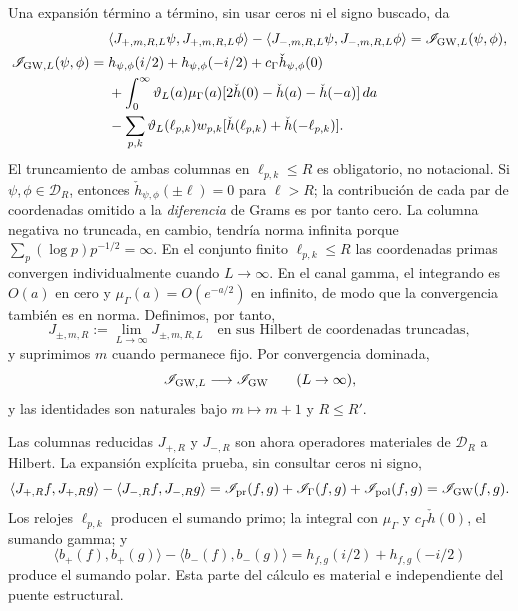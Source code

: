 Una expansión término a término, sin usar ceros ni el signo buscado, da
\begin{align*}
 &\langle J_{+,m,R,L}\psi,J_{+,m,R,L}\phi\rangle
 -\langle J_{-,m,R,L}\psi,J_{-,m,R,L}\phi\rangle
 =\mathscr I_{{\rm GW},L}(\psi,\phi),\\
 \mathscr I_{{\rm GW},L}(\psi,\phi)
 ={}&h_{\psi,\phi}(i/2)+h_{\psi,\phi}(-i/2)
 +c_\Gamma\check h_{\psi,\phi}(0)\\
 &+\int_0^\infty\vartheta_L(a)\mu_\Gamma(a)
 [2\check h(0)-\check h(a)-\check h(-a)]\,da\\
 &-\sum_{p,k}\vartheta_L(\ell_{p,k})w_{p,k}
 [\check h(\ell_{p,k})+\check h(-\ell_{p,k})].
\end{align*}
El truncamiento de ambas columnas en \(\ell_{p,k}\leq R\) es obligatorio, no
notacional. Si \(\psi,\phi\in\mathcal D_R\), entonces
\(\check h_{\psi,\phi}(\pm\ell)=0\) para \(\ell>R\); la contribución de cada
par de coordenadas omitido a la \emph{diferencia} de Grams es por tanto cero.
La columna negativa no truncada, en cambio, tendría norma infinita porque
\(\sum_p(\log p)p^{-1/2}=\infty\). En el conjunto finito
\(\ell_{p,k}\leq R\) las coordenadas primas convergen individualmente cuando
\(L\to\infty\). En el canal gamma, el integrando es \(O(a)\) en cero y
\(\mu_\Gamma(a)=O(e^{-a/2})\) en infinito, de modo que la convergencia también
es en norma. Definimos, por tanto,
\begin{equation}\label{eq:pdf2-rh-columnas-reducidas}
 J_{\pm,m,R}:=\lim_{L\to\infty}J_{\pm,m,R,L}
 \quad\text{en sus Hilbert de coordenadas truncadas},
\end{equation}
y suprimimos \(m\) cuando permanece fijo. Por convergencia dominada,
\[
 \mathscr I_{{\rm GW},L}\longrightarrow\mathscr I_{\rm GW}
 \qquad(L\to\infty),
\]
y las identidades son naturales bajo $m\mapsto m+1$ y $R\le R'$.

Las columnas reducidas \(J_{+,R}\) y \(J_{-,R}\) son ahora operadores
materiales de \(\mathcal D_R\) a Hilbert. La expansión explícita prueba, sin
consultar ceros ni signo,
\begin{equation}\label{eq:pdf2-rh-gram-difference-gw}
 \langle J_{+,R}f,J_{+,R}g\rangle
 -\langle J_{-,R}f,J_{-,R}g\rangle
 =\mathscr I_{\rm pr}(f,g)+\mathscr I_\Gamma(f,g)
  +\mathscr I_{\rm pol}(f,g)
 =\mathscr I_{\rm GW}(f,g).
\end{equation}
Los relojes \(\ell_{p,k}\) producen el sumando primo; la integral con
\(\mu_\Gamma\) y \(c_\Gamma\check h(0)\), el sumando gamma; y
\[
 \langle b_+(f),b_+(g)\rangle-
 \langle b_-(f),b_-(g)\rangle
 =h_{f,g}(i/2)+h_{f,g}(-i/2)
\]
produce el sumando polar. Esta parte del cálculo es material e independiente
del puente estructural.

